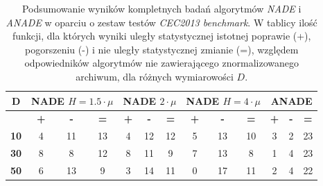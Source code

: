 \documentclass[12pt,a4paper]{report}
\begin{document}
{{{{{{{\begin{table}[h]
\centering
\caption{Podsumowanie wyników kompletnych badań algorytmów \emph{NADE} i \emph{ANADE} w oparciu o zestaw testów \emph{CEC2013 benchmark}. W tablicy ilość funkcji, dla których wyniki uległy statystycznej istotnej poprawie (+), pogorszeniu (-) i nie uległy statystycznej zmianie (=), względem odpowiedników algorytmów nie zawierającego znormalizowanego archiwum, dla różnych wymiarowości $D$.}
\label{FULLSUMMARY}
\begin{tabular}{|c|c|c|c|c|c|c|c|c|c|c|c|c|}
\hline
{\bf D}  & \multicolumn{3}{c|}{{\bf NADE $H=1.5 \cdot \mu$}} & \multicolumn{3}{c|}{{\bf NADE $2 \cdot \mu$}} & \multicolumn{3}{c|}{{\bf NADE $H=4 \cdot \mu$}} & \multicolumn{3}{c|}{{\bf ANADE}} \\ \hline
         & {\bf\hspace{3mm}+\hspace{3mm}}       & {\bf\hspace{4mm}-\hspace{4mm}}      & {\bf\hspace{1mm}=\hspace{1mm}}      & {\bf\hspace{1mm}+\hspace{1mm}}       & {\bf\hspace{1mm}-\hspace{1mm}}       & {\bf\hspace{1mm}=}       & {\bf\hspace{2mm}+\hspace{2mm}}        & {\bf\hspace{3mm}-\hspace{3mm}}        & {\bf\hspace{1mm}=\hspace{1mm}}       & {\bf\hspace{1mm}+\hspace{1mm}}   & {\bf\hspace{1mm}-\hspace{1mm}}   & {\bf\hspace{1mm}=\hspace{1mm}}  \\ \hline
{\bf 10} & 4             & 11            & 13            & 4             & 12             & 12             & 5              & 13              & 10            & 3         & 2         & 23        \\ \hline
{\bf 30} & 8             & 8            & 12            & 8             & 11             & 9             & 7              & 13              & 8             & 1         & 4         & 23        \\ \hline
{\bf 50} & 6             & 13            & 9            & 3             & 14             & 11             & 0              & 17              & 11             & 2         & 4         &  22        \\ \hline
\end{tabular}
\end{table}

}}}}}}}
\end{document}
